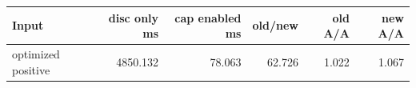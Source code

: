 \begin{center}
\small
\begin{tabular}{lrrrrr}
\toprule
Input & disc only ms & cap enabled ms & old/new & old A/A & new A/A\\
\midrule
optimized positive & 4850.132 & 78.063 & 62.726 & 1.022 & 1.067\\
\bottomrule
\end{tabular}
\end{center}
